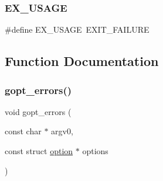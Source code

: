 \subsubsection{\texorpdfstring{E\+X\+\_\+\+U\+S\+A\+GE}{EX\_USAGE}}
{\footnotesize\ttfamily \#define E\+X\+\_\+\+U\+S\+A\+GE~E\+X\+I\+T\+\_\+\+F\+A\+I\+L\+U\+RE}



\subsection{Function Documentation}
\mbox{\label{gopt-errors_8c_a4e86a5003bf59357d83816f46e914e53}} 
\subsubsection{\texorpdfstring{gopt\+\_\+errors()}{gopt\_errors()}}
{\footnotesize\ttfamily void gopt\+\_\+errors (\begin{DoxyParamCaption}\item[{const char $\ast$}]{argv0,  }\item[{const struct \hyperlink{structoption}{option} $\ast$}]{options }\end{DoxyParamCaption})}

